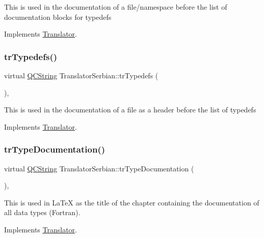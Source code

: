 This is used in the documentation of a file/namespace before the list of documentation blocks for typedefs 

Implements \mbox{\hyperlink{class_translator}{Translator}}.

\mbox{\label{class_translator_serbian_aa586d76a9fac0d8e35a6dcddd3b24ede}} 
\subsubsection{\texorpdfstring{trTypedefs()}{trTypedefs()}}
{\footnotesize\ttfamily virtual \mbox{\hyperlink{class_q_c_string}{Q\+C\+String}} Translator\+Serbian\+::tr\+Typedefs (\begin{DoxyParamCaption}{ }\end{DoxyParamCaption})\hspace{0.3cm}{\ttfamily [inline]}, {\ttfamily [virtual]}}

This is used in the documentation of a file as a header before the list of typedefs 

Implements \mbox{\hyperlink{class_translator}{Translator}}.

\mbox{\label{class_translator_serbian_ae72a4b8a5605fa0e63b7dce0c54c4696}} 
\subsubsection{\texorpdfstring{trTypeDocumentation()}{trTypeDocumentation()}}
{\footnotesize\ttfamily virtual \mbox{\hyperlink{class_q_c_string}{Q\+C\+String}} Translator\+Serbian\+::tr\+Type\+Documentation (\begin{DoxyParamCaption}{ }\end{DoxyParamCaption})\hspace{0.3cm}{\ttfamily [inline]}, {\ttfamily [virtual]}}

This is used in La\+TeX as the title of the chapter containing the documentation of all data types (Fortran). 

Implements \mbox{\hyperlink{class_translator}{Translator}}.

\mbox{\label{class_translator_serbian_aa9a9dc092958f35036de0d798cc2c1c5}} 
